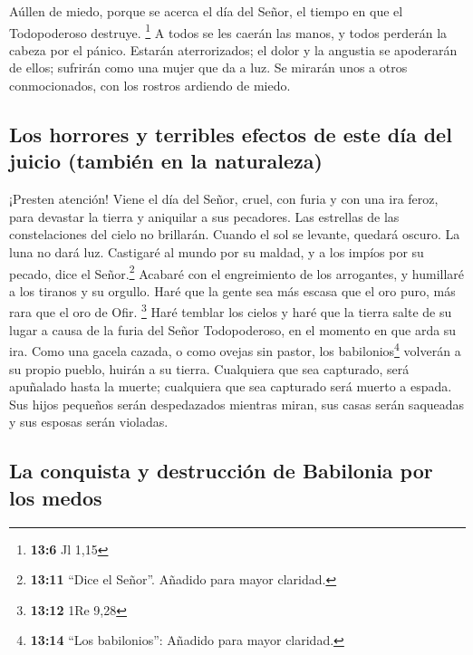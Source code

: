  Aúllen de miedo, porque se acerca el día del Señor, el
tiempo en que el Todopoderoso destruye. \footnote{\textbf{13:6} Jl 1,15}
 A todos se les caerán las manos, y todos perderán la
cabeza por el pánico.  Estarán aterrorizados; el dolor y
la angustia se apoderarán de ellos; sufrirán como una mujer que da a
luz. Se mirarán unos a otros conmocionados, con los rostros ardiendo de
miedo.

\hypertarget{los-horrores-y-terribles-efectos-de-este-duxeda-del-juicio-tambiuxe9n-en-la-naturaleza}{%
\subsection{Los horrores y terribles efectos de este día del juicio
(también en la
naturaleza)}\label{los-horrores-y-terribles-efectos-de-este-duxeda-del-juicio-tambiuxe9n-en-la-naturaleza}}

 ¡Presten atención! Viene el día del Señor, cruel, con
furia y con una ira feroz, para devastar la tierra y aniquilar a sus
pecadores.  Las estrellas de las constelaciones del cielo
no brillarán. Cuando el sol se levante, quedará oscuro. La luna no dará
luz.  Castigaré al mundo por su maldad, y a los impíos
por su pecado, dice el Señor.\footnote{\textbf{13:11} ``Dice el Señor''.
  Añadido para mayor claridad.} Acabaré con el engreimiento de los
arrogantes, y humillaré a los tiranos y su orgullo.  Haré
que la gente sea más escasa que el oro puro, más rara que el oro de
Ofir. \footnote{\textbf{13:12} 1Re 9,28}  Haré temblar
los cielos y haré que la tierra salte de su lugar a causa de la furia
del Señor Todopoderoso, en el momento en que arda su ira.
 Como una gacela cazada, o como ovejas sin pastor, los
babilonios\footnote{\textbf{13:14} ``Los babilonios'': Añadido para
  mayor claridad.} volverán a su propio pueblo, huirán a su tierra.
 Cualquiera que sea capturado, será apuñalado hasta la
muerte; cualquiera que sea capturado será muerto a espada.
 Sus hijos pequeños serán despedazados mientras miran,
sus casas serán saqueadas y sus esposas serán violadas.

\hypertarget{la-conquista-y-destrucciuxf3n-de-babilonia-por-los-medos}{%
\subsection{La conquista y destrucción de Babilonia por los
medos}\label{la-conquista-y-destrucciuxf3n-de-babilonia-por-los-medos}}

